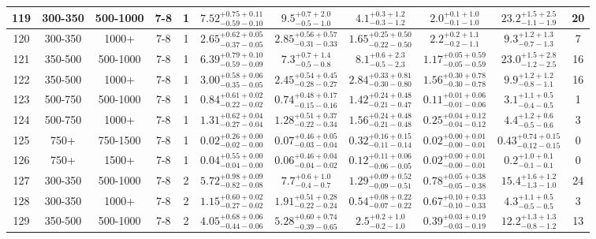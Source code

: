 \documentclass[11pt, oneside]{article}
\begin{document}
\begin{table}
{\begin{tabular}{ |c|c|c|c|c||c|c|c|c||c|c| }
119 & 300-350 & 500-1000 & 7-8 & 1 & $7.52^{+0.75+0.11}_{-0.59-0.10}$ & $9.5^{+0.7+2.0}_{-0.5-1.0}$ & $4.1^{+0.3+1.2}_{-0.3-1.2}$ & $2.0^{+0.1+1.0}_{-0.1-1.0}$ & $23.2^{+1.5+2.5}_{-1.1-1.9}$ & 20 \\ \hline
120 & 300-350 & 1000+ & 7-8 & 1 & $2.65^{+0.62+0.05}_{-0.37-0.05}$ & $2.85^{+0.56+0.57}_{-0.31-0.33}$ & $1.65^{+0.25+0.50}_{-0.22-0.50}$ & $2.2^{+0.2+1.1}_{-0.2-1.1}$ & $9.3^{+1.2+1.3}_{-0.7-1.3}$ & 7 \\ \hline
121 & 350-500 & 500-1000 & 7-8 & 1 & $6.39^{+0.79+0.10}_{-0.59-0.09}$ & $7.3^{+0.7+1.4}_{-0.5-0.8}$ & $8.1^{+0.6+2.3}_{-0.5-2.3}$ & $1.17^{+0.05+0.59}_{-0.05-0.59}$ & $23.0^{+1.5+2.8}_{-1.2-2.5}$ & 16 \\ \hline
122 & 350-500 & 1000+ & 7-8 & 1 & $3.00^{+0.58+0.06}_{-0.35-0.05}$ & $2.45^{+0.54+0.45}_{-0.28-0.27}$ & $2.84^{+0.33+0.81}_{-0.30-0.80}$ & $1.56^{+0.30+0.78}_{-0.30-0.78}$ & $9.9^{+1.2+1.2}_{-0.8-1.1}$ & 16 \\ \hline
123 & 500-750 & 500-1000 & 7-8 & 1 & $0.84^{+0.61+0.02}_{-0.22-0.02}$ & $0.74^{+0.48+0.17}_{-0.15-0.16}$ & $1.42^{+0.24+0.48}_{-0.21-0.47}$ & $0.11^{+0.01+0.06}_{-0.01-0.06}$ & $3.1^{+1.1+0.5}_{-0.4-0.5}$ & 1 \\ \hline
124 & 500-750 & 1000+ & 7-8 & 1 & $1.31^{+0.62+0.04}_{-0.27-0.04}$ & $1.28^{+0.51+0.37}_{-0.22-0.34}$ & $1.56^{+0.24+0.48}_{-0.21-0.48}$ & $0.25^{+0.04+0.12}_{-0.04-0.12}$ & $4.4^{+1.2+0.6}_{-0.5-0.6}$ & 3 \\ \hline
125 & 750+ & 750-1500 & 7-8 & 1 & $0.02^{+0.26+0.00}_{-0.02-0.00}$ & $0.07^{+0.46+0.05}_{-0.03-0.04}$ & $0.32^{+0.16+0.15}_{-0.11-0.14}$ & $0.02^{+0.00+0.01}_{-0.00-0.01}$ & $0.43^{+0.74+0.15}_{-0.12-0.15}$ & 0 \\ \hline
126 & 750+ & 1500+ & 7-8 & 1 & $0.04^{+0.55+0.00}_{-0.04-0.00}$ & $0.06^{+0.46+0.04}_{-0.04-0.02}$ & $0.12^{+0.11+0.06}_{-0.06-0.05}$ & $0.02^{+0.00+0.01}_{-0.00-0.01}$ & $0.2^{+1.0+0.1}_{-0.1-0.1}$ & 0 \\ \hline
127 & 300-350 & 500-1000 & 7-8 & 2 & $5.72^{+0.98+0.09}_{-0.82-0.08}$ & $7.7^{+0.6+1.0}_{-0.4-0.7}$ & $1.29^{+0.09+0.52}_{-0.09-0.51}$ & $0.78^{+0.05+0.38}_{-0.05-0.38}$ & $15.4^{+1.6+1.2}_{-1.3-1.0}$ & 24 \\ \hline
128 & 300-350 & 1000+ & 7-8 & 2 & $1.15^{+0.60+0.02}_{-0.27-0.02}$ & $1.91^{+0.51+0.28}_{-0.22-0.24}$ & $0.54^{+0.08+0.22}_{-0.07-0.22}$ & $0.67^{+0.10+0.33}_{-0.10-0.33}$ & $4.3^{+1.1+0.5}_{-0.5-0.5}$ & 3 \\ \hline
129 & 350-500 & 500-1000 & 7-8 & 2 & $4.05^{+0.68+0.06}_{-0.44-0.06}$ & $5.28^{+0.60+0.74}_{-0.39-0.65}$ & $2.5^{+0.2+1.0}_{-0.2-1.0}$ & $0.39^{+0.03+0.19}_{-0.03-0.19}$ & $12.2^{+1.3+1.3}_{-0.8-1.2}$ & 13 \\ \hline

\end{tabular}}
\end{table}
\end{document}
